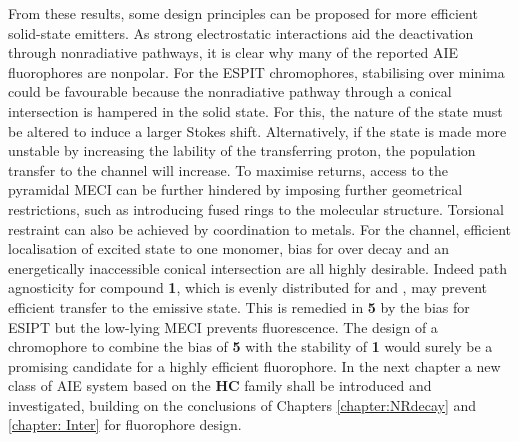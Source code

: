 From these results, some design principles can be proposed for more efficient solid-state emitters. As strong electrostatic interactions aid the deactivation through nonradiative pathways, it is clear why many of the reported AIE fluorophores are nonpolar. For the ESPIT chromophores, stabilising \Estar{} over \Kstar{} minima could be favourable because the \Estar{} nonradiative pathway through a conical intersection is hampered in the solid state. For this, the nature of the \Estar{} state must be altered to induce a larger Stokes shift. Alternatively, if the \Estar{} state is made more unstable by increasing the lability of the transferring proton, the population transfer to the \Kstar{} channel will increase. To maximise returns, access to the pyramidal \Kstar{} MECI can be further hindered by imposing further geometrical restrictions, such as introducing fused rings to the molecular structure. Torsional restraint can also be achieved by coordination to metals.\cite{Karsili2016} For the \Kstar{} channel, efficient localisation of excited state to one monomer, bias for \Kstar{} over \Estar{} decay and an energetically inaccessible conical intersection are all highly desirable. Indeed path agnosticity for compound \textbf{1}, which is evenly distributed for \Estar{} and \Kstar{}, may prevent efficient transfer to the emissive \Kstar{} state. This is remedied in \textbf{5} by the bias for ESIPT but the low-lying MECI prevents fluorescence. The design of a chromophore to combine the \Kstar{} bias of \textbf{5} with the stability of \textbf{1} would surely be a promising candidate for a highly efficient fluorophore.  In the next chapter a new class of AIE system based on the \textbf{HC} family shall be introduced and investigated, building on the conclusions of Chapters \ref{chapter:NRdecay} and \ref{chapter: Inter} for fluorophore design. 